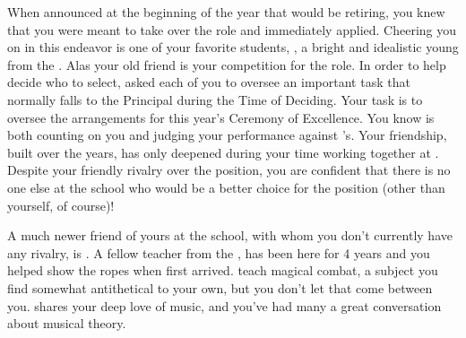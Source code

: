 \documentclass[char]{GL2020}
\begin{document}
When \cPrincipal{} announced at the beginning of the year that \cPrincipal{\they} would be retiring, you knew that you were meant to take over the role and immediately applied. Cheering you on in this endeavor is one of your favorite students, \cDisney{\full}, a bright and idealistic young \cDisney{\person} from the \pFarm{}. Alas your old friend \cBeetle{} is your competition for the role. In order to help \cPrincipal{} decide who to select, \cPrincipal{\they} \cPrincipal{\have} asked each of you to oversee an important task that normally falls to the Principal during the Time of Deciding. Your task is to oversee the arrangements for this year's Ceremony of Excellence. You know \cPrincipal{} is both counting on you and judging your performance against \cBeetle{}'s. Your friendship, built over the years, has only deepened during your time working together at \pSchool{}. Despite your friendly rivalry over the position, you are confident that there is no one else at the school who would be a better choice for the position (other than yourself, of course)! 

A much newer friend of yours at the school, with whom you don't currently have any rivalry, is \cInterpol{\full}. A fellow teacher from the \pFarm{}, \cInterpol{} has been here for 4 years and you helped show \cInterpol{\them} the ropes when \cInterpol{\they} first arrived. \cInterpol{\They} teach\cInterpol{\pluralC} magical combat, a subject you find somewhat antithetical to your own, but you don't let that come between you. \cInterpol{} shares your deep love of music, and you've had many a great conversation about musical theory.
\end{document}
